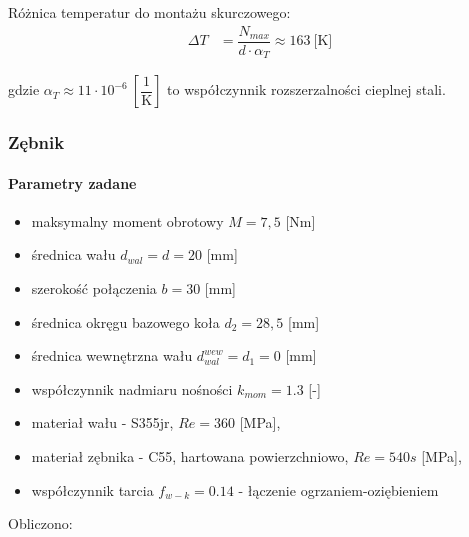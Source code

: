 		\noindent Różnica temperatur do montażu skurczowego:
		\begin{align}
			\Delta T &= \dfrac{N_{max}}{d \cdot \alpha_T} \approx 163 \ \text{[K]}
		\end{align}
		
		gdzie $\alpha_T \approx 11 \cdot 10^{-6} \ \left[\dfrac{1}{\text{K}}\right]$ to współczynnik rozszerzalności cieplnej stali.

		\subsubsection{Zębnik}
		\paragraph{Parametry zadane}
		\begin{itemize}
			\item maksymalny moment obrotowy $M = 7,5$ [Nm]
			\item średnica wału $d_{wal} = d = 20$ [mm]
			\item szerokość połączenia $b = 30$ [mm]
			\item średnica okręgu bazowego koła $d_2 = 28,5$ [mm]
			\item średnica wewnętrzna wału $d_{wal}^{wew} = d_1 = 0$ [mm]
			\item współczynnik nadmiaru nośności $k_{mom} = 1.3$ [-]
			\item materiał wału - S355jr, $Re = 360$ [MPa],
			\item materiał zębnika - C55, hartowana powierzchniowo, $Re = 540s$ [MPa],
			\item współczynnik tarcia $f_{w-k} = 0.14$ - łączenie ogrzaniem-oziębieniem
		\end{itemize}
		Obliczono:

